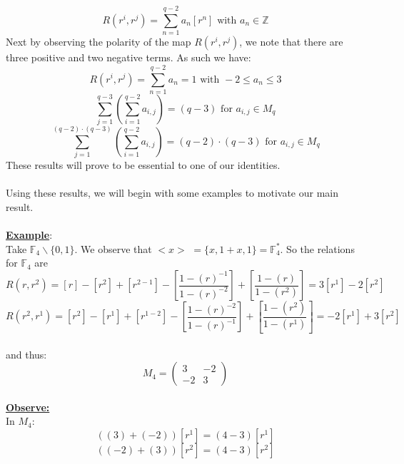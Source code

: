 \documentclass[11pt]{article}
\theoremstyle{plain}
\theoremstyle{definition}
\begin{document}
\begin{equation*}
R(r^{i}, r^{j}) = \sum\limits_{n=1}^{q-2} a_n [r^n]  \text{ with } a_n \in \mathbb{Z}
\end{equation*}
Next by observing the polarity of the map $R(r^{i}, r^{j})$, we note that there are three positive and two negative terms. As such we have:
\begin{equation*}
R(r^{i}, r^{j}) = \sum\limits_{n=1}^{q-2} a_n =1 \text{ with } -2 \leq a_n \leq 3
\end{equation*}
\begin{equation*}
\sum\limits_{j=1}^{q-3}( \sum\limits_{i=1}^{q-2} a_{i,j}) = (q-3) \text{ for } a_{i,j} \in M_q
\end{equation*}
\begin{equation*}
\sum\limits_{j=1}^{(q-2)\cdot(q-3)}( \sum\limits_{i=1}^{q-2} a_{i,j}) = (q-2) \cdot (q-3) \text{ for } a_{i,j} \in M_q
\end{equation*}
These results will prove to be essential to one of our identities.\\
\\
Using these results, we will begin with some examples to motivate our main result.\\
\\
\textbf{\underline{Example}}: \\Take $\mathbb{F}_{4}  \backslash \{0,1\}$. We observe that $<x>$  $= \{x,1+x,1\} = \mathbb{F}_{4} ^{*}$.  So the relations for $\mathbb{F}_4$ are \\
\begin{equation*}
R(r, r^2) = [r] - [r^{2}] + [r^{2-1}] - [\frac{1-(r)^{-1}}{1-(r)^{-2}}] + [\frac{1-(r)}{1-(r^2)}] = 3[r^1] - 2[r^2]
\end{equation*}
\begin{equation*}
R(r^2, r^1) = [r^2] - [r^{1}] + [r^{1-2}] - [\frac{1-(r)^{-2}}{1-(r)^{-1}}] + [\frac{1-(r^2)}{1-(r^1)}] = -2[r^1] + 3[r^2]
\end{equation*}
\\
and thus:
\\
\[ M_4 = \left( \begin{array}{cc}
3  & -2 \\
-2 &   3 \end{array} \right)\]
\\
\textbf{\underline{Observe:}} \\In $M_4$:
\begin{equation*}
((3) + (-2))[r^1] = (4-3)[r^1]
\end{equation*}
\begin{equation*}
((-2) + (3))[r^2] = (4-3)[r^2]
\end{equation*}
\end{document}
